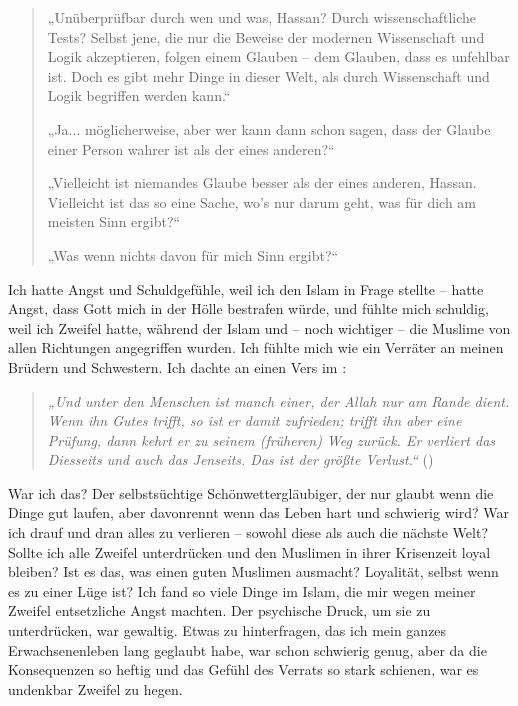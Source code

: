 \documentclass[12pt]{memoir}
\begin{document}
\begin{quote}
„Unüberprüfbar durch wen und was, Hassan?
Durch wissenschaftliche Tests?
Selbst jene, die nur die Beweise der modernen Wissenschaft
und Logik akzeptieren, folgen einem Glauben –
dem Glauben, dass es unfehlbar ist.
Doch es gibt mehr Dinge in dieser Welt,
als durch Wissenschaft und Logik begriffen werden kann.“

„Ja... möglicherweise, aber wer kann dann schon sagen,
dass der Glaube einer Person wahrer ist als der eines anderen?“

„Vielleicht ist niemandes Glaube besser als der eines anderen, Hassan.
Vielleicht ist das so eine Sache, wo’s nur darum geht,
was für dich am meisten Sinn ergibt?“

„Was wenn nichts davon für mich Sinn ergibt?“
\end{quote}

Ich hatte Angst und Schuldgefühle,
weil ich den Islam in Frage stellte –
hatte Angst, dass Gott mich in der Hölle bestrafen würde,
und fühlte mich schuldig, weil ich Zweifel hatte,
während der Islam und – noch wichtiger – die Muslime
von allen Richtungen angegriffen wurden.
Ich fühlte mich wie ein Verräter an meinen Brüdern und Schwestern.
Ich dachte an einen Vers im \Quran:

\begin{quote}
\emph{„Und unter den Menschen ist manch einer, der Allah nur am Rande dient.
Wenn ihn Gutes trifft, so ist er damit zufrieden;
trifft ihn aber eine Prüfung, dann kehrt er zu seinem (früheren) Weg zurück.
Er verliert das Diesseits und auch das Jenseits.
Das ist der größte Verlust.“} ()
\end{quote}

War ich das?
Der selbstsüchtige Schönwettergläubiger,
der nur glaubt wenn die Dinge gut laufen,
aber davonrennt wenn das Leben hart und schwierig wird?
War ich drauf und dran alles zu verlieren –
sowohl diese als auch die nächste Welt?
Sollte ich alle Zweifel unterdrücken und den Muslimen
in ihrer Krisenzeit loyal bleiben?
Ist es das, was einen guten Muslimen ausmacht?
Loyalität, selbst wenn es zu einer Lüge ist?
Ich fand so viele Dinge im Islam,
die mir wegen meiner Zweifel entsetzliche Angst machten.
Der psychische Druck, um sie zu unterdrücken, war gewaltig.
Etwas zu hinterfragen,
das ich mein ganzes Erwachsenenleben lang geglaubt habe,
war schon schwierig genug,
aber da die Konsequenzen so heftig
und das Gefühl des Verrats so stark schienen,
war es undenkbar Zweifel zu hegen.


\end{document}
